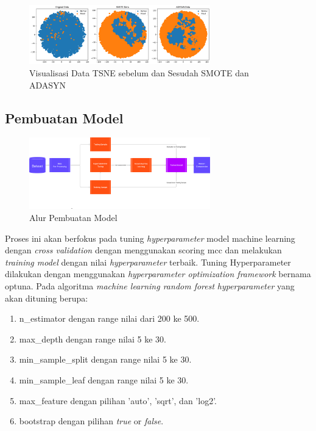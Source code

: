 \begin{figure}[H]
	\centering
	\includegraphics[width=0.7\textwidth]{figure/plot tsne.png}
	\caption{Visualisasi Data TSNE sebelum dan Sesudah SMOTE dan ADASYN}
	\label{fig:3.Visualisasi Data TSNE sebelum dan Sesudah SMOTE dan ADASYN}
\end{figure}

\subsection{Pembuatan Model}
\begin{figure}[H]
	\centering
	\includegraphics[width=0.7\textwidth]{figure/AlurPembuatanModel.png}
	\caption{Alur Pembuatan Model}
	\label{fig:3.alur pembuatan model}
\end{figure}
Proses ini akan berfokus pada tuning \textit{hyperparameter} model machine learning dengan \textit{cross validation} dengan menggunakan scoring mcc dan melakukan \textit{training model} dengan nilai \textit{hyperparameter} terbaik. Tuning Hyperparameter dilakukan dengan menggunakan \textit{hyperparameter optimization framework} bernama optuna. Pada algoritma \textit{machine learning random forest} \textit{hyperparameter} yang akan dituning berupa\cite{albahli2024efficient}:
\begin{enumerate}[noitemsep]
    \item n\_estimator dengan range nilai dari 200 ke 500.
    \item max\_depth dengan range nilai 5 ke 30.
    \item min\_sample\_split dengan range nilai 5 ke 30.
    \item min\_sample\_leaf dengan range nilai 5 ke 30.
    \item max\_feature dengan pilihan 'auto', 'sqrt', dan 'log2'.
    \item bootstrap dengan pilihan \textit{true} or \textit{false}.
\end{enumerate}

